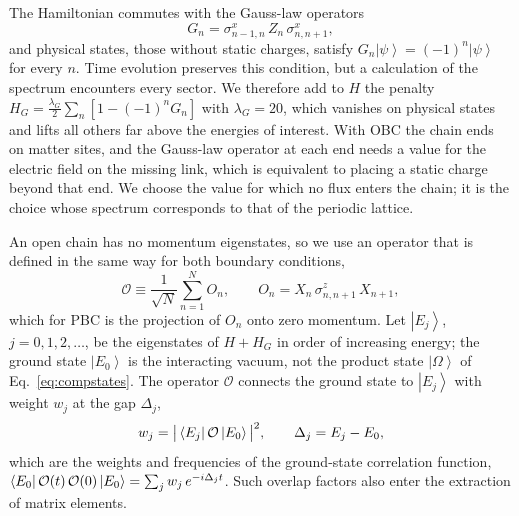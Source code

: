 \documentclass[twocolumn,superscriptaddress,showpacs,nofootinbib,notitlepage,preprintnumbers,secnumarabic,amssymb, floatfix, nobibnotes, aps, prd]{revtex4-2}
\newcommand{\ket}[1]{\left| #1 \right>} %
\newcommand{\mbraket}[3]{\left< #1 \vphantom{#2#3} \right|
 #2 \left| #3 \vphantom{#1#2} \right>} %
\begin{document}
The Hamiltonian commutes with the Gauss-law operators
\begin{equation}
\label{eq:gauss}
    G_n = \sigma^{x}_{n-1,n}\, Z_n\, \sigma^{x}_{n,n+1},
\end{equation}
and physical states, those without static charges, satisfy $G_n\ket{\psi}=(-1)^n\ket{\psi}$ for every $n$.
Time evolution preserves this condition, but a calculation of the spectrum encounters every sector.
We therefore add to $H$ the penalty $H_G=\tfrac{\lambda_G}{2}\sum_n[1-(-1)^nG_n]$ with $\lambda_G=20$, which vanishes on physical states and lifts all others far above the energies of interest.
With OBC the chain ends on matter sites, and the Gauss-law operator at each end needs a value for the electric field on the missing link, which is equivalent to placing a static charge beyond that end.
We choose the value for which no flux enters the chain; it is the choice whose spectrum corresponds to that of the periodic lattice.

An open chain has no momentum eigenstates, so we use an operator that is defined in the same way for both boundary conditions,
\begin{equation}
\label{eq:Odef}
   \mathcal{O} \equiv \frac{1}{\sqrt{N}} \sum_{n=1}^{N} O_n,
   \qquad
   O_n = X_n\,\sigma^{z}_{n,n+1}\,X_{n+1},
\end{equation}
which for PBC is the projection of $O_n$ onto zero momentum.
Let $\ket{E_j}$, $j=0,1,2,\dots$, be the eigenstates of $H+H_G$ in order of increasing energy; the ground state $\ket{E_0}$ is the interacting vacuum, not the product state $\ket{\Omega}$ of Eq.~\eqref{eq:compstates}.
The operator $\mathcal{O}$ connects the ground state to $\ket{E_j}$ with weight $w_j$ at the gap $\Delta_j$,
\begin{equation}
\label{eq:weights}
   w_j = \big|\mbraket{E_j}{\mathcal{O}}{E_0}\big|^2,
   \qquad
   \Delta_j = E_j-E_0 ,
\end{equation}
which are the weights and frequencies of the ground-state correlation function, $\mbraket{E_0}{\mathcal{O}(t)\,\mathcal{O}(0)}{E_0}=\sum_j w_j\,e^{-i\Delta_j t}$.
Such overlap factors also enter the extraction of matrix elements.
\end{document}
